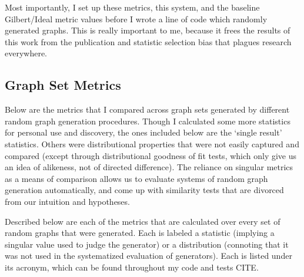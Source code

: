 \documentclass[11pt,a4paper]{report}
\begin{document}
Most importantly, I set up these metrics, this system, and the baseline Gilbert/Ideal metric values before I wrote a line of code which randomly generated graphs.
This is really important to me, because it frees the results of this work from the publication and statistic selection bias that plagues research everywhere.

\subsection{Graph Set Metrics}
Below are the metrics that I compared across graph sets generated by different random graph generation procedures.
Though I calculated some more statistics for personal use and discovery, the ones included below are the `single result' statistics.
Others were distributional properties that were not easily captured and compared (except through distributional goodness of fit tests, which only give us an idea of alikeness, not of directed difference).
The reliance on singular metrics as a means of comparison allows us to evaluate systems of random graph generation automatically, and come up with similarity tests that are divorced from our intuition and hypotheses.

Described below are each of the metrics that are calculated over every set of random graphs that were generated.
Each is labeled a statistic (implying a singular value used to judge the generator) or a distribution (connoting that it was not used in the systematized evaluation of generators).
Each is listed under its acronym, which can be found throughout my code and tests CITE. 
\end{document}
